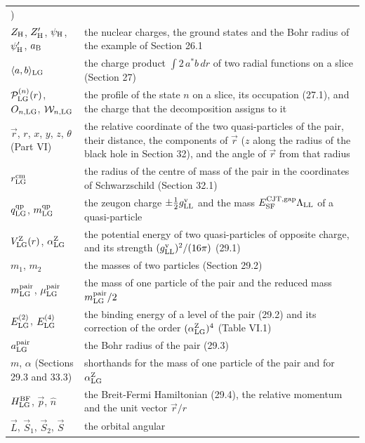 \documentclass[
  10pt,
]{article}
\begin{document}
\begin{longtable}[]{@{}
  >{\raggedright\arraybackslash}p{}
  >{\raggedright\arraybackslash}p{}@{}}
26.1) \\
\(Z_{\rm H}\), \(Z'_{\rm H}\), \(\psi_{\rm H}\), \(\psi'_{\rm H}\),
\(a_{\rm B}\) & the nuclear charges, the ground states and the Bohr
radius of the example of Section 26.1 \\
\(\langle a,b\rangle_{\rm LG}\) & the charge product \(\int2\,a^*b\,dr\)
of two radial functions on a slice (Section 27) \\
\(\mathcal P^{(n)}_{\rm LG}(r)\), \(O_{n,{\rm LG}}\),
\(\mathcal W_{n,{\rm LG}}\) & the profile of the state \(n\) on a slice,
its occupation (27.1), and the charge that the decomposition assigns to
it \\
\(\vec r\), \(r\), \(x\), \(y\), \(z\), \(\theta\) (Part VI) & the
relative coordinate of the two quasi-particles of the pair, their
distance, the components of \(\vec r\) (\(z\) along the radius of the
black hole in Section 32), and the angle of \(\vec r\) from that
radius \\
\(r^{\rm cm}_{\rm LG}\) & the radius of the centre of mass of the pair
in the coordinates of Schwarzschild (Section 32.1) \\
\(q^{\rm qp}_{\rm LG}\), \(m^{\rm qp}_{\rm LG}\) & the zeugon charge
\(\pm\tfrac12g^{\rm v}_{\rm LL}\) and the mass
\(E^{\rm CJT,gap}_{\rm SF}\Lambda_{\rm LL}\) of a quasi-particle \\
\(V^{\rm Z}_{\rm LG}(r)\), \(\alpha^{\rm Z}_{\rm LG}\) & the potential
energy of two quasi-particles of opposite charge, and its strength
\((g^{\rm v}_{\rm LL})^2/(16\pi)\) (29.1) \\
\(m_1\), \(m_2\) & the masses of two particles (Section 29.2) \\
\(m^{\rm pair}_{\rm LG}\), \(\mu^{\rm pair}_{\rm LG}\) & the mass of one
particle of the pair and the reduced mass \(m^{\rm pair}_{\rm LG}/2\) \\
\(E^{(2)}_{\rm LG}\), \(E^{(4)}_{\rm LG}\) & the binding energy of a
level of the pair (29.2) and its correction of the order
\((\alpha^{\rm Z}_{\rm LG})^4\) (Table VI.1) \\
\(a^{\rm pair}_{\rm LG}\) & the Bohr radius of the pair (29.3) \\
\(m\), \(\alpha\) (Sections 29.3 and 33.3) & shorthands for the mass of
one particle of the pair and for \(\alpha^{\rm Z}_{\rm LG}\) \\
\(H^{\rm BF}_{\rm LG}\), \(\vec p\), \(\hat n\) & the Breit-Fermi
Hamiltonian (29.4), the relative momentum and the unit vector
\(\vec r/r\) \\
\(\vec L\), \(\vec S_1\), \(\vec S_2\), \(\vec S\) & the orbital angular

\end{longtable}
\end{document}
